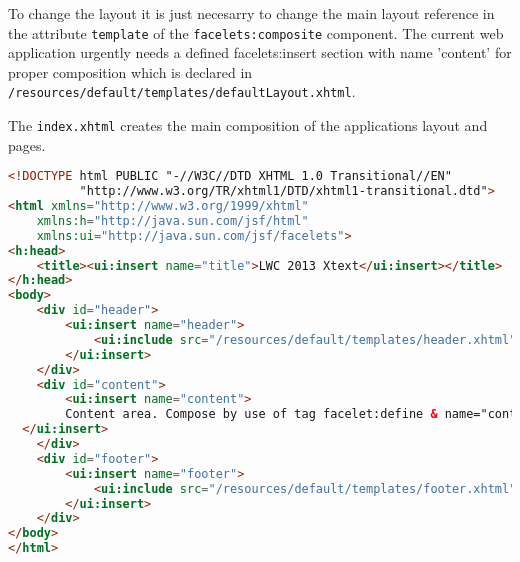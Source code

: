 To change the layout it is just necesarry to change the main layout reference in
the attribute \texttt{template} of the \texttt{facelets:composite} component.
The current web application urgently needs a defined facelets:insert section
with name 'content' for proper composition which is declared in
\texttt{/resources/default/templates/defaultLayout.xhtml}.

 
The \texttt{index.xhtml} creates the main composition of the applications layout
and pages. 
\begin{lstlisting}[language=HTML]
<!DOCTYPE html PUBLIC "-//W3C//DTD XHTML 1.0 Transitional//EN" 
          "http://www.w3.org/TR/xhtml1/DTD/xhtml1-transitional.dtd">
<html xmlns="http://www.w3.org/1999/xhtml"
	xmlns:h="http://java.sun.com/jsf/html"
	xmlns:ui="http://java.sun.com/jsf/facelets">
<h:head>
	<title><ui:insert name="title">LWC 2013 Xtext</ui:insert></title>
</h:head>
<body>
	<div id="header">
		<ui:insert name="header">
			<ui:include src="/resources/default/templates/header.xhtml" />
		</ui:insert>
	</div>
	<div id="content">
		<ui:insert name="content">
    	Content area. Compose by use of tag facelet:define & name="content".
  </ui:insert>
	</div>
	<div id="footer">
		<ui:insert name="footer">
			<ui:include src="/resources/default/templates/footer.xhtml" />
		</ui:insert>
	</div>
</body>
</html>
\end{lstlisting}

